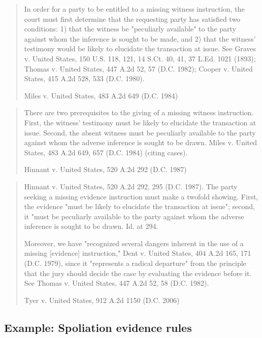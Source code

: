 \documentclass[
  10pt,
  dvipsnames,enabledeprecatedfontcommands]{scrartcl}
\begin{document}
\begin{quote}
In order for a party to be entitled to a missing witness instruction, the court must first determine that the requesting party has satisfied two conditions: 1) that the witness be "peculiarly available" to the party against whom the inference is sought to be made, and 2) that the witness' testimony would be likely to elucidate the transaction at issue. See Graves v. United States, 150 U.S. 118, 121, 14 S.Ct. 40, 41, 37 L.Ed. 1021 (1893); Thomas v. United States, 447 A.2d 52, 57 (D.C. 1982); Cooper  v. United States, 415 A.2d 528, 533 (D.C. 1980).

Miles v. United States, 483 A.2d 649 (D.C. 1984)
\end{quote}

\begin{quote}
There are two prerequisites to the giving of a missing witness instruction. First, the witness' testimony must be likely to elucidate the transaction at issue. Second, the absent witness must be peculiarly available to the party against whom the adverse inference is sought to be drawn. Miles v. United States, 483 A.2d 649, 657 (D.C. 1984) (citing cases).

Hinnant v. United States, 520 A.2d 292 (D.C. 1987)
\end{quote}

\begin{quote} 
Hinnant v. United States, 520 A.2d 292, 295 (D.C. 1987). The party seeking a missing evidence instruction must make a twofold showing. First, the evidence "must be likely to elucidate the transaction at issue"; second, it "must be peculiarly available to the party against whom the adverse inference is sought to be drawn. Id. at 294.

Moreover, we have "recognized several dangers inherent in the use of a missing [evidence] instruction," Dent v. United States, 404 A.2d 165, 171 (D.C. 1979), since it "represents a radical departure" from the principle that the jury should decide the case by evaluating the evidence before it. See Thomas v. United States, 447 A.2d 52, 58 (D.C. 1982).

Tyer v. United States, 912 A.2d 1150 (D.C. 2006)
\end{quote}


\hypertarget{example-spoliation-evidence-rules}{%
\subsection{Example: Spoliation evidence
rules}\label{example-spoliation-evidence-rules}}
\end{document}
